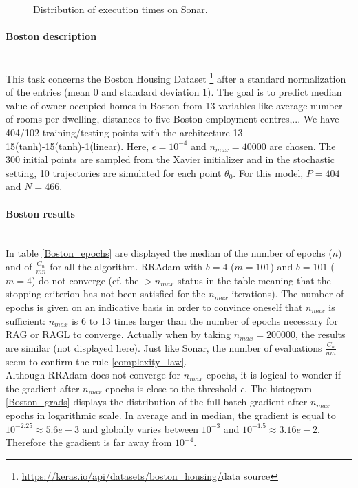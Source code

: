 \begin{figure}[h!]
	\centering
	\scalebox{0.9}{}
	\caption{Distribution of execution times on Sonar.}
	\label{Sonar_time}
\end{figure} 

\paragraph{Boston description}
~~\\
This task concerns the Boston Housing Dataset \footnote{\url{https://keras.io/api/datasets/boston_housing/}{data source}} after a standard normalization of the entries (mean $0$
and standard deviation $1$). The goal is to predict median value of owner-occupied homes in Boston from 13 variables like average number of rooms per dwelling, distances to five
Boston employment centres,... We have 404/102 training/testing points with the architecture 13-15(tanh)-15(tanh)-1(linear). Here, $\epsilon=10^{-4}$ and $n_{max}=40000$ are chosen. The $300$ initial points are sampled from the Xavier initializer and in the stochastic setting, 10 trajectories are simulated for each point $\theta_0$. For this model, $P=404$ and $N=466$.

\paragraph{Boston results}
~~\\
In table \ref{Boston_epochs} are displayed the median of the number of epochs ($n$) and of $\frac{C_n}{mn}$ for all the algorithm. RRAdam with $b=4$ ($m=101$) and $b=101$ ($m=4$)
do not converge (cf. the $> n_{max}$ status in the table meaning that the stopping criterion has not been satisfied for the $n_{max}$ iterations). The number of epochs is given on
an indicative basis in order to convince oneself that $n_{max}$ is sufficient: $n_{max}$ is 6 to 13 times larger than the number of epochs necessary for RAG or RAGL to converge.
Actually when by taking $n_{max}=200000$, the results are similar (not displayed here).
Just like Sonar, the number of evaluations $\frac{C_n}{nm}$ seem to confirm the rule \eqref{complexity_law}. \\
Although RRAdam does not converge for $n_{max}$ epochs, it is logical to wonder if the gradient after $n_{max}$ epochs is close to the threshold $\epsilon$. The histogram
\ref{Boston_grads} displays the distribution of the full-batch gradient after $n_{max}$ epochs in logarithmic scale. In average and in median, the gradient is equal to $10^{-2.25}\approx 5.6e-3$ and globally varies between $10^{-3}$ and $10^{-1.5}\approx3.16e-2$. Therefore the gradient is far away from $10^{-4}$. 

